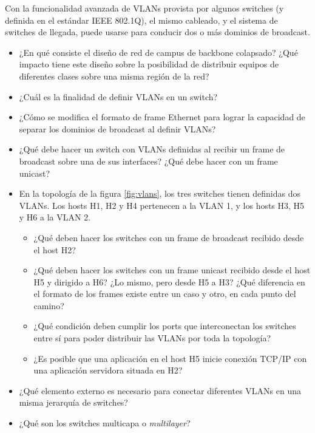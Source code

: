 


Con la funcionalidad avanzada de VLANs provista por algunos switches (y definida en el estándar IEEE 802.1Q), el mismo cableado, y el sistema de switches de llegada, puede usarse para conducir dos o más dominios de broadcast. 
 
\begin{itemize}


	\item ¿En qué consiste el diseño de red de campus de backbone colapsado? ¿Qué impacto tiene este diseño sobre la posibilidad de distribuir equipos de diferentes clases sobre una misma región de la red?
	\item 
¿Cuál es la finalidad de definir VLANs en un switch? 

	\item 
¿Cómo se modifica el formato de frame Ethernet para lograr la capacidad de separar los dominios de broadcast al definir VLANs?

	\item ¿Qué debe hacer un switch con VLANs definidas al recibir un frame de broadcast sobre una de sus interfaces? ¿Qué debe hacer con un frame unicast?

	\item En la topología de la figura \ref{fig:vlans}, los tres switches tienen definidas dos VLANs. Los hosts H1, H2 y H4 pertenecen a la VLAN 1, y los hosts H3, H5 y H6 a la VLAN 2. 

	\begin{itemize}
		\item ¿Qué deben hacer los switches con un frame de broadcast recibido desde el host H2?
		\item ¿Qué deben hacer los switches con un frame unicast recibido desde el host H5 y dirigido a H6? ¿Lo mismo, pero desde H5 a H3? ¿Qué diferencia en el formato de los frames existe entre un caso y otro, en cada punto del camino?
		\item ¿Qué condición deben cumplir los ports que interconectan los switches entre sí para poder distribuir las VLANs por toda la topología?
		\item ¿Es posible que una aplicación en el host H5 inicie conexión TCP/IP con una aplicación servidora situada en H2? 
	\end{itemize} 

\item ¿Qué elemento externo es necesario para conectar diferentes VLANs en una misma jerarquía de switches? 
\item ¿Qué son los switches multicapa o \emph{multilayer}? 
\end{itemize} 

